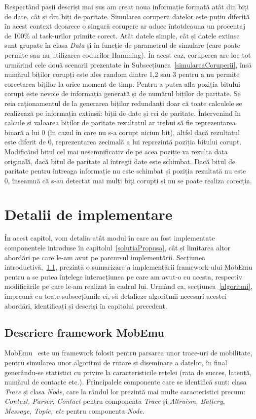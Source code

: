 \documentclass[12pt,a4paper]{report}
\begin{document}
Respectând pașii descriși mai sus am creat noua informație formată atât din biți de date, cât și din biți de paritate. Simularea coruperii datelor este puțin diferită în acest context deoarece o singură corupere ar aduce întotdeauna un procentaj de 100\% al task-urilor primite corect. Atât datele simple, cât și datele extinse sunt grupate în clasa \textit{Data} și în funcție de parametrul de simulare (care poate permite sau nu utilizarea codurilor Hamming). În acest caz, coruperea are loc tot urmărind cele două scenarii prezentate în Subsecțiunea~\ref{simulareaCoruperii}, însă numărul biților corupți este ales random dintre 1,2 sau 3 pentru a nu permite corectarea biților la orice moment de timp. Pentru a putea afla poziția bitului corupt este nevoie de informația generată și de numărul biților de paritate. Se reia raționamentul de la generarea biților redundanți doar că toate calculele se realizează pe informația extinsă: biții de date și cei de paritate. Întervenind în calcule și valoarea biților de paritate rezultatul ar trebui să fie reprezentarea binară a lui 0 (în cazul în care nu s-a corupt niciun bit), altfel dacă rezultatul este diferit de 0, reprezentarea zecimală a lui reprezintă poziția bitului corupt. Modificând bitul cel mai nesemnificativ de pe acea poziție va rezulta data originală, dacă bitul de paritate al întregii date este schimbat. Dacă bitul de paritate pentru întreaga informație nu este schimbat și poziția rezultată nu este 0, înseamnă că s-au detectat mai mulți biți corupți și nu se poate realiza corecția.

\chapter{Detalii de implementare}	\label{detalii}

În acest capitol, vom detalia atât modul în care au fost implementate componentele introduse în capitolul~\ref{solutiaPropusa}, cât și limitarea altor abordări pe care le-am avut pe parcursul implementării. Secțiunea introductivă,~\ref{introducere}, prezintă o sumarizare a implementării framework-ului MobEmu pentru a se putea înțelege interacțiunea pe care am avut-o cu acesta, respectiv modificările pe care le-am realizat în cadrul lui. 
Urmând ca, secțiunea~\ref{algoritmi}, împreună cu toate subsecțiunile ei, să detalieze algoritmii necesari acestei abordări, identificați și descriși în capitolul precedent.
 
\section{Descriere framework MobEmu} \label{introducere}
MobEmu~\cite{MobEmuArticle} este un framework folosit pentru parsarea unor trace-uri de mobilitate, pentru simularea unor algoritmi de rutare și diseminare a datelor, în final generându-se statistici cu privire la caracteristicile rețelei (rata de succes, latență, numărul de contacte etc.). Principalele componente care se identifică sunt:  clasa \textit{Trace} și clasa \textit{Node}, care la rândul lor prezintă mai multe caracteristici precum: \textit{Context, Parser, Contact} pentru componenta \textit{Trace} și \textit{Altruism, Battery, Message, Topic, etc} pentru componenta \textit{Node}.
\end{document}

